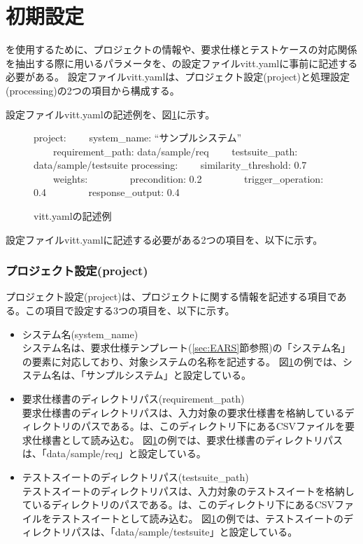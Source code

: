 \section{初期設定}\label{sec:config}

\tool を使用するために、プロジェクトの情報や、要求仕様とテストケースの対応関係を抽出する際に用いるパラメータを、\tool{}の設定ファイルvitt.yamlに事前に記述する必要がある。
設定ファイルvitt.yamlは、プロジェクト設定(project)と処理設定(processing)の2つの項目から構成する。

設定ファイルvitt.yamlの記述例を、図\ref{fig:setting_example}に示す。

\begin{figure}[t]
    \vbox{
        \vbox{project:}
        \vbox{\ \ \ \ system\_name: ``サンプルシステム''}             
        \vbox{\ \ \ \ requirement\_path: data/sample/req}
        \vbox{\ \ \ \ testsuite\_path: data/sample/testsuite}
        \vbox{processing:}
        \vbox{\ \ \ \ similarity\_threshold: 0.7}
        \vbox{\ \ \ \ weights:}
        \vbox{\ \ \ \ \ \ \ \ precondition: 0.2}
        \vbox{\ \ \ \ \ \ \ \ trigger\_operation: 0.4}
        \vbox{\ \ \ \ \ \ \ \ response\_output: 0.4}
	}
	\centerline{}
    \caption{vitt.yamlの記述例}
    \label{fig:setting_example}
\end{figure}

設定ファイルvitt.yamlに記述する必要がある2つの項目を、以下に示す。

\subsubsection{プロジェクト設定(project)}\label{subsubsec:project_setting}
プロジェクト設定(project)は、プロジェクトに関する情報を記述する項目である。この項目で設定する3つの項目を、以下に示す。

\begin{itemize}
    \item システム名(system\_name) \\
    システム名は、要求仕様テンプレート(\ref{sec:EARS}節参照)の「システム名」の要素に対応しており、対象システムの名称を記述する。
    図\ref{fig:setting_example}の例では、システム名は、「サンプルシステム」と設定している。
    \item 要求仕様書のディレクトリパス(requirement\_path) \\
    要求仕様書のディレクトリパスは、入力対象の要求仕様書を格納しているディレクトリのパスである。\tool は、このディレクトリ下にあるCSVファイルを要求仕様書として読み込む。
    図\ref{fig:setting_example}の例では、要求仕様書のディレクトリパスは、「data/sample/req」と設定している。
    \item テストスイートのディレクトリパス(testsuite\_path) \\
    テストスイートのディレクトリパスは、入力対象のテストスイートを格納しているディレクトリのパスである。\tool は、このディレクトリ下にあるCSVファイルをテストスイートとして読み込む。
    図\ref{fig:setting_example}の例では、テストスイートのディレクトリパスは、「data/sample/testsuite」と設定している。
\end{itemize}

